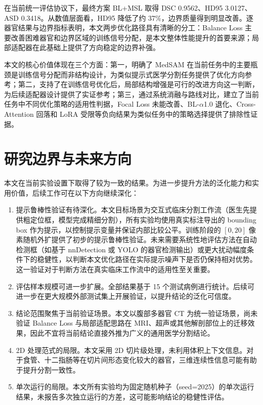 在当前统一评估协议下，最终方案 BL+MSL 取得 DSC 0.9562、HD95 3.0127、ASD 0.3418。从数值层面看，HD95 降低了约 37\%，边界质量得到明显改善。逐器官结果与边界指标表明，本文两步优化路径具有清晰的分工：Balance Loss 主要改善困难器官和边界区域的训练信号分配，是本文整体性能提升的首要来源；局部适配器在此基础上提供了方向稳定的边界补强。

本文的核心价值体现在三个方面：第一，明确了 MedSAM 在当前任务中的主要瓶颈是训练信号分配而非结构设计，为类似提示式医学分割任务提供了优化方向参考；第二，支持了在训练信号优化后，局部结构增强是可行的改进方向这一判断，为后续适配器设计提供了实证参考；第三，通过系统消融与路线对比，建立了当前任务中不同优化策略的适用性判据，Focal Loss 未能改善、BL-$\alpha$1.0 退化、Cross-Attention 回落和 LoRA 受限等负向结果为类似任务中的策略选择提供了排除性证据。

\section{研究边界与未来方向}

本文在当前实验设置下取得了较为一致的结果。为进一步提升方法的泛化能力和实用价值，后续工作可在以下方向继续深化：

\begin{enumerate}
  \item 提示鲁棒性验证有待深化。本文目标场景为交互式临床分割工作流（医生先提供粗定位框，模型完成精细分割），所有实验均使用真实标注导出的 bounding box 作为提示，以控制提示变量并保证内部比较公平。训练阶段的 $[0, 20]$ 像素随机外扩提供了初步的提示鲁棒性验证。未来需要系统性地评估方法在自动检测框（如基于 nnDetection 或 YOLO 的器官检测输出）或更大扰动幅度条件下的稳健性，以判断本文优化路径在实际提示噪声下是否仍保持相对优势。这一验证对于判断方法在真实临床工作流中的适用性至关重要。

  \item 评估样本规模可进一步扩展。全部结果基于 15 个测试病例进行统计。后续可进一步在更大规模外部测试集上开展验证，以提升结论的泛化可信度。

  \item 结论范围聚焦于当前验证场景。本文以腹部多器官 CT 为统一验证场景，尚未验证 Balance Loss 与局部适配思路在 MRI、超声或其他解剖部位上的迁移效果，因此不宜将当前结论直接外推为广义的通用医学分割结论。

  \item 2D 处理范式的局限。本文采用 2D 切片级处理，未利用体积上下文信息。对于食管、十二指肠等在切片间形态变化较大的器官，三维连续性信息可能有助于提升分割一致性。

  \item 单次运行的局限。本文所有实验均为固定随机种子（seed=2025）的单次运行结果，未报告多次独立运行的方差，这可能影响结论的稳健性评估。
\end{enumerate}


